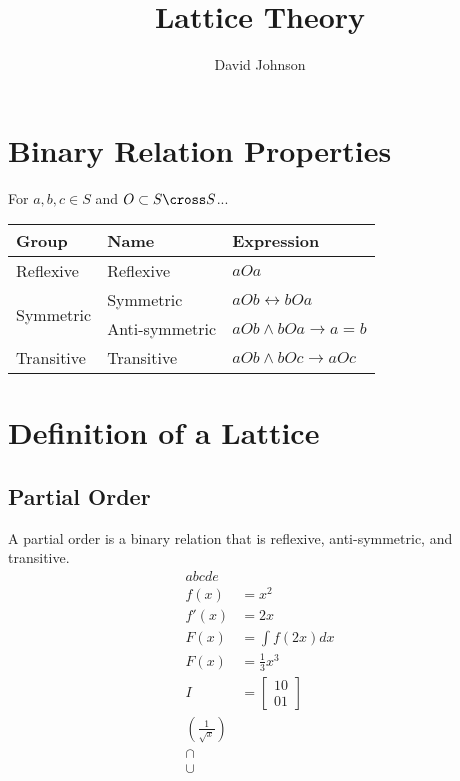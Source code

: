 \documentclass{article}
\author{David Johnson}
\title{Lattice Theory}
\date{}
\begin{document}
        \maketitle{}
        \tableofcontents{}

        \newpage
        \section{Binary Relation Properties}
        For $a, b, c \in S$ and $O \subset S \cross S$...
        \begin{table}[h!]
                  \label{tab:table1}
                  \begin{tabular}{l|l|l}
                        \textbf{Group} & \textbf{Name} & \textbf{Expression}\\
                        \hline
                        \multirow{1}{*}{Reflexive} & Reflexive      & $aOa$\\
                        \hline
                        \multirow{2}{*}{Symmetric} & Symmetric      & $aOb \leftrightarrow bOa$\\
                                                   & Anti-symmetric & $aOb \wedge bOa \rightarrow a = b$\\
                        \hline
                        \multirow{1}{*}{Transitive} & Transitive    & $aOb \wedge bOc \rightarrow aOc$\\
                  \end{tabular}
        \end{table}

        \newpage
        \section{Definition of a Lattice}
        \subsection{Partial Order}
        A partial order is a binary relation that is reflexive, anti-symmetric, and transitive.
        \begin{align}
                abcde\\
                f(x) &= x^2\\
                f'(x) &= 2x\\
                F(x) &= \int f(2x)dx\\
                F(x) &= \frac{1}{3}x^3\\
                I &=    \begin{bmatrix}
                                1 0\\
                                0 1
                        \end{bmatrix}\\
                \left(\frac{1}{\sqrt{x}}\right)\\
                \cap\\
                \cup
        \end{align}
\end{document}

